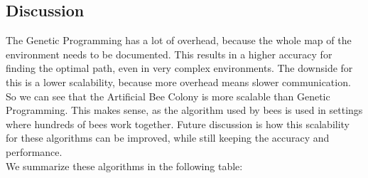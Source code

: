 \subsection{Discussion}
The Genetic Programming has a lot of overhead, because the whole map of the environment needs to be documented. 
This results in a higher accuracy for finding the optimal path, even in very complex environments. 
The downside for this is a lower scalability, because more overhead means slower communication.
So we can see that the Artificial Bee Colony is more scalable than Genetic Programming.
This makes sense, as the algorithm used by bees is used in settings where hundreds of bees work together. 
Future discussion is how this scalability for these algorithms can be improved, while still keeping the accuracy and performance. \\
    
We summarize these algorithms in the following table:

  \begin{table}[H]
  \renewcommand{\arraystretch}{1.3}
  \caption{Path-planning algorithms}
  \label{table_alg_path_planning}
  \centering
{}
  \end{table}

  

